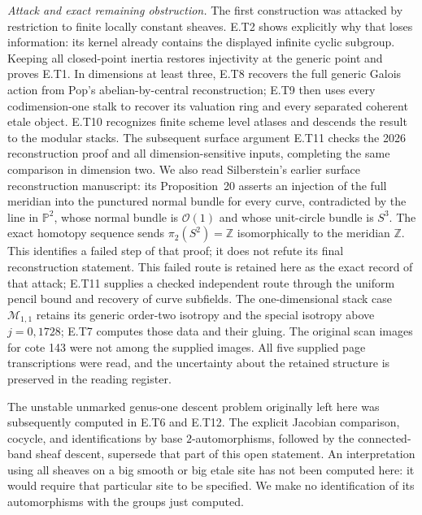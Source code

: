 \noindent\emph{Attack and exact remaining obstruction.}
The first construction was attacked by restriction to finite
locally constant sheaves.  E.T2 shows explicitly why that loses
information: its kernel already contains the displayed infinite
cyclic subgroup.  Keeping all closed-point inertia restores
injectivity at the generic point and proves E.T1.  In dimensions at least three, E.T8 recovers the full generic
Galois action from Pop's abelian-by-central reconstruction;
E.T9 then uses every codimension-one stalk to recover its
valuation ring and every separated coherent etale object.
E.T10 recognizes finite scheme level atlases and descends
the result to the modular stacks.  The subsequent surface
argument E.T11 checks the 2026 reconstruction proof and all
dimension-sensitive inputs, completing the same comparison
in dimension two.  We also read Silberstein's earlier surface
reconstruction manuscript: its Proposition~20 asserts an
injection of the full meridian into the punctured normal
bundle for every curve, contradicted by the line in
$\mathbb P^2$, whose normal bundle is $\mathcal O(1)$
and whose unit-circle bundle is $S^3$.  The exact homotopy
sequence sends $\pi_2(S^2)=\mathbb Z$ isomorphically to
the meridian $\mathbb Z$.  This identifies a failed step
of that proof; it does not refute its final reconstruction
statement.  This failed route is retained here as the exact
record of that attack; E.T11 supplies a checked independent
route through the uniform pencil bound and recovery of
curve subfields.
The one-dimensional stack case $\mathcal M_{1,1}$ retains
its generic order-two isotropy and the special isotropy
above $j=0,1728$; E.T7 computes those data and their gluing.
The original scan images for cote 143 were not among the
supplied images.  All five supplied page transcriptions were
read, and the uncertainty about the retained structure is
preserved in the reading register.

The unstable unmarked genus-one descent problem originally
left here was subsequently computed in E.T6 and E.T12.  The explicit
Jacobian comparison, cocycle, and identifications by base
$2$-automorphisms, followed by the connected-band sheaf
descent, supersede that part of this open statement.  An
interpretation using all sheaves on a big smooth or big etale
site has not been computed here: it would require that
particular site to be specified.  We make no identification
of its automorphisms with the groups just computed.

